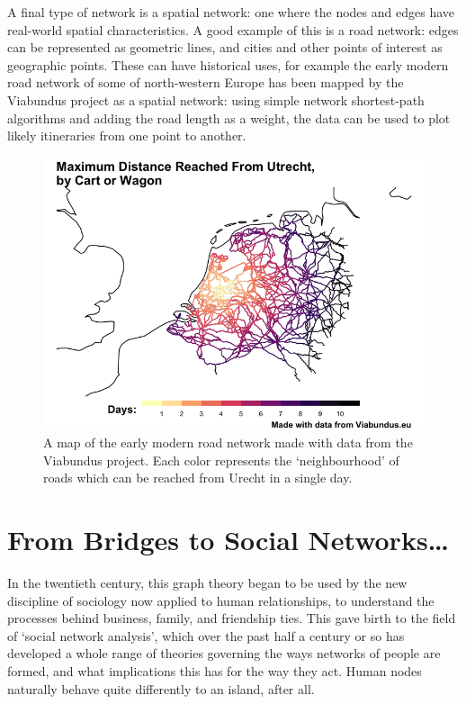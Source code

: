 \documentclass[
]{book}
\begin{document}
A final type of network is a spatial network: one where the nodes and edges have real-world spatial characteristics. A good example of this is a road network: edges can be represented as geometric lines, and cities and other points of interest as geographic points. These can have historical uses, for example the early modern road network of some of north-western Europe has been mapped by the Viabundus project as a spatial network: using simple network shortest-path algorithms and adding the road length as a weight, the data can be used to plot likely itineraries from one point to another.

\begin{figure}
\centering
\includegraphics[width=5.20833in,height=\textheight]{images/viabundus.png}
\caption{A map of the early modern road network made with data from the Viabundus project. Each color represents the `neighbourhood' of roads which can be reached from Urecht in a single day.}
\end{figure}

\hypertarget{from-bridges-to-social-networks}{%
\section{From Bridges to Social Networks\ldots{}}\label{from-bridges-to-social-networks}}

In the twentieth century, this graph theory began to be used by the new discipline of sociology now applied to human relationships, to understand the processes behind business, family, and friendship ties. This gave birth to the field of `social network analysis', which over the past half a century or so has developed a whole range of theories governing the ways networks of people are formed, and what implications this has for the way they act. Human nodes naturally behave quite differently to an island, after all.
\end{document}
